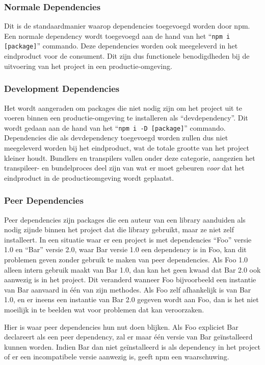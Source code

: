 \subsubsection{Normale Dependencies}

Dit is de standaardmanier waarop dependencies toegevoegd worden door npm. Een normale dependency wordt toegevoegd aan de hand van het ``\lstinline{npm i [package]}'' commando. Deze dependencies worden ook meegeleverd in het eindproduct voor de consument. Dit zijn dus functionele benodigdheden bij de uitvoering van het project in een productie-omgeving.

\subsubsection{Development Dependencies}

Het wordt aangeraden om packages die niet nodig zijn om het project uit te voeren binnen een productie-omgeving te installeren als ``devdependency''. Dit wordt gedaan aan de hand van het ``\lstinline{npm i -D [package]}'' commando. Dependencies die als devdependency toegevoegd worden zullen dus niet meegeleverd worden bij het eindproduct, wat de totale grootte van het project kleiner houdt. Bundlers en transpilers vallen onder deze categorie, aangezien het transpileer- en bundelproces deel zijn van wat er moet gebeuren \emph{voor} dat het eindproduct in de productieomgeving wordt geplaatst.

\subsubsection{Peer Dependencies}

Peer dependencies zijn packages die een auteur van een library aanduiden als nodig zijnde binnen het project dat die library gebruikt, maar ze niet zelf installeert. In een situatie waar er een project is met dependencies ``Foo'' versie 1.0 en ``Bar'' versie 2.0, waar Bar versie 1.0 een dependency is in Foo, kan dit problemen geven zonder gebruik te maken van peer dependencies. Als Foo 1.0 alleen intern gebruik maakt van Bar 1.0, dan kan het geen kwaad dat Bar 2.0 ook aanwezig is in het project. Dit veranderd wanneer Foo bijvoorbeeld een instantie van Bar aanvaard in één van zijn methodes. Als Foo zelf afhankelijk is van Bar 1.0, en er ineens een instantie van Bar 2.0 gegeven wordt aan Foo, dan is het niet moeilijk in te beelden wat voor problemen dat kan veroorzaken.

Hier is waar peer dependencies hun nut doen blijken. Als Foo expliciet Bar declareert als een peer dependency, zal er maar één versie van Bar geïnstalleerd kunnen worden. Indien Bar dan niet geïnstalleerd is als dependency in het project of er een incompatibele versie aanwezig is, geeft npm een waarschuwing. \autocite{de_witt_2016}

